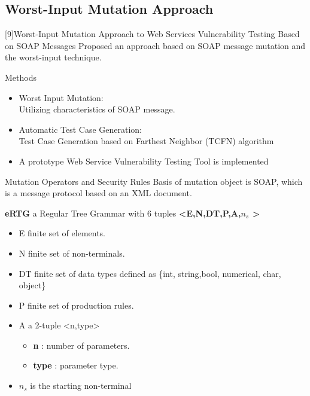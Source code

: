 \documentclass[10pt]{beamer}
\begin{document}
\subsection{Worst-Input Mutation Approach}
\begin{frame}{[9]Worst-Input Mutation Approach to Web Services Vulnerability Testing Based on SOAP Messages}
Proposed an approach based on SOAP message mutation and the worst-input technique.
\begin{block}{Methods}
\begin{itemize}
\item Worst Input Mutation:\\
		Utilizing characteristics of SOAP message.
\item Automatic Test Case Generation:\\
	Test Case Generation based on Farthest Neighbor (TCFN) algorithm
\item A prototype Web Service Vulnerability Testing Tool is implemented
\end{itemize}
\end{block}
\end{frame}
\begin{frame}{Mutation Operators and Security Rules}{}
Basis of mutation object is SOAP, which is a message protocol based on an XML document.
\begin{block}{\textbf{eRTG}}
a Regular Tree Grammar with 6 tuples \textbf{<E,N,DT,P,A,$n_s$ >}
\begin{itemize}
\item E finite set of elements.
\item N finite set of non-terminals.
\item DT finite set of data types defined as \{int, string,bool, numerical, char, object\}
\item P finite set of production rules.
\item A a 2-tuple <n,type>
\begin{itemize}
\item \textbf{n} : number of parameters.
\item \textbf{type} : parameter type.
\end{itemize} 
\item $n_s$ is the starting non-terminal
\end{itemize}
\end{block}
\end{frame}
\end{document}
